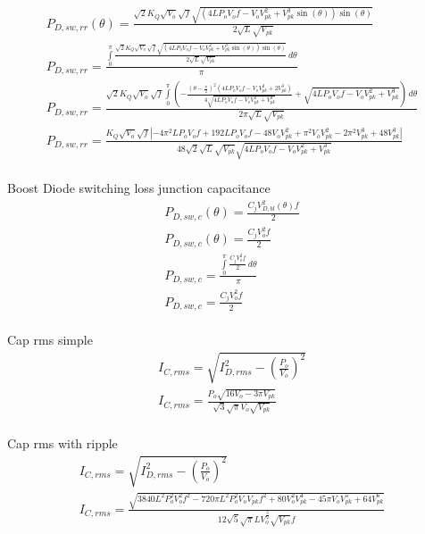 \documentclass[12pt]{report}
\begin{document}
\begin{align}
P_{D,sw,rr}(\theta) = \frac{\sqrt{2} K_{Q} \sqrt{V_{o}} \sqrt{f} \sqrt{\left(4 L P_{o} V_{o} f - V_{o} V_{pk}^{2} + V_{pk}^{3} \sin{\left(\theta \right)}\right) \sin{\left(\theta \right)}}}{2 \sqrt{L} \sqrt{V_{pk}}}\\
P_{D,sw,rr} = \frac{\int\limits_{0}^{\pi} \frac{\sqrt{2} K_{Q} \sqrt{V_{o}} \sqrt{f} \sqrt{\left(4 L P_{o} V_{o} f - V_{o} V_{pk}^{2} + V_{pk}^{3} \sin{\left(\theta \right)}\right) \sin{\left(\theta \right)}}}{2 \sqrt{L} \sqrt{V_{pk}}}\, d\theta}{\pi}\\
P_{D,sw,rr} = \frac{\sqrt{2} K_{Q} \sqrt{V_{o}} \sqrt{f} \int\limits_{0}^{\pi} \left(- \frac{\left(\theta - \frac{\pi}{2}\right)^{2} \left(4 L P_{o} V_{o} f - V_{o} V_{pk}^{2} + 2 V_{pk}^{3}\right)}{4 \sqrt{4 L P_{o} V_{o} f - V_{o} V_{pk}^{2} + V_{pk}^{3}}} + \sqrt{4 L P_{o} V_{o} f - V_{o} V_{pk}^{2} + V_{pk}^{3}}\right)\, d\theta}{2 \pi \sqrt{L} \sqrt{V_{pk}}}\\
P_{D,sw,rr} = \frac{K_{Q} \sqrt{V_{o}} \sqrt{f} \left|{- 4 \pi^{2} L P_{o} V_{o} f + 192 L P_{o} V_{o} f - 48 V_{o} V_{pk}^{2} + \pi^{2} V_{o} V_{pk}^{2} - 2 \pi^{2} V_{pk}^{3} + 48 V_{pk}^{3}}\right|}{48 \sqrt{2} \sqrt{L} \sqrt{V_{pk}} \sqrt{4 L P_{o} V_{o} f - V_{o} V_{pk}^{2} + V_{pk}^{3}}}\\
\end{align}

Boost Diode switching loss junction capacitance
\begin{align}
P_{D,sw,c}(\theta) = \frac{C_{j}V_{D,bl}^{2}(\theta)f}{2}\\
P_{D,sw,c}(\theta) = \frac{C_{j} V_{o}^{2} f}{2}\\
P_{D,sw,c} = \frac{\int\limits_{0}^{\pi} \frac{C_{j} V_{o}^{2} f}{2}\, d\theta}{\pi}\\
P_{D,sw,c} = \frac{C_{j} V_{o}^{2} f}{2}\\
\end{align}

Cap rms simple
\begin{align}
I_{C,rms} = \sqrt{I_{D,rms}^2 - (\frac{P_o}{V_o})^2}\\
I_{C,rms} = \frac{P_{o} \sqrt{16 V_{o} - 3 \pi V_{pk}}}{\sqrt{3} \sqrt{\pi} V_{o} \sqrt{V_{pk}}}\\
\end{align}

Cap rms with ripple
\begin{align}
I_{C,rms} = \sqrt{I_{D,rms}^2 - (\frac{P_o}{V_o})^2}\\
I_{C,rms} = \frac{\sqrt{3840 L^{2} P_{o}^{2} V_{o}^{2} f^{2} - 720 \pi L^{2} P_{o}^{2} V_{o} V_{pk} f^{2} + 80 V_{o}^{2} V_{pk}^{4} - 45 \pi V_{o} V_{pk}^{5} + 64 V_{pk}^{6}}}{12 \sqrt{5} \sqrt{\pi} L V_{o}^{\frac{3}{2}} \sqrt{V_{pk}} f}\\
\end{align}
\end{document}
